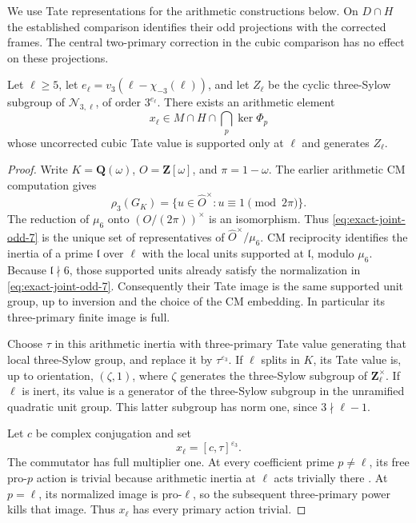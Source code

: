 We use Tate representations for the arithmetic
constructions below. On \(D\cap H\) the established
comparison identifies their odd projections with the
corrected frames. The central two-primary correction in
the cubic comparison has no effect on these projections.

\begin{lemma}\label{lem:local-cubic-cm-inertia}
Let \(\ell\ge5\), let
\(e_\ell=v_3(\ell-\chi_{-3}(\ell))\), and let
\(Z_\ell\) be the cyclic three-Sylow subgroup of
\(\mathcal N_{3,\ell}\), of order \(3^{e_\ell}\).
There exists an arithmetic element
\[
 x_\ell\in M\cap H\cap\bigcap_p\ker\Phi_p
\]
whose uncorrected cubic Tate value is supported only at \(\ell\)
and generates \(Z_\ell\).
\end{lemma}

\begin{proof}
Write \(K=\mathbf Q(\omega)\), \(O=\mathbf Z[\omega]\), and
\(\pi=1-\omega\).
The earlier arithmetic CM computation gives
\begin{equation}\label{eq:exact-joint-odd-7}
\rho_3(G_K)=
 \{u\in\widehat O^\times:u\equiv1\pmod{2\pi}\}.
\end{equation}
The reduction of \(\mu_6\) onto
\((O/(2\pi))^\times\) is an isomorphism.
Thus \eqref{eq:exact-joint-odd-7} is the unique set of representatives of
\(\widehat O^\times/\mu_6\).
CM reciprocity
\cite[Theorem~12.27, p.~124]{MilneMF110} identifies the
inertia of a prime \(\mathfrak l\) over \(\ell\) with the
local units supported at \(\mathfrak l\), modulo \(\mu_6\).
Because \(\mathfrak l\nmid6\), those supported units already
satisfy the normalization in \eqref{eq:exact-joint-odd-7}.
Consequently their Tate image is the same supported
unit group, up to inversion and the choice of the CM
embedding. In particular its three-primary finite image
is full.

Choose \(\tau\) in this arithmetic inertia with three-primary
Tate value generating that local three-Sylow group, and
replace it by \(\tau^{\varepsilon_3}\).
If \(\ell\) splits in \(K\), its Tate value is, up to orientation,
\((\zeta,1)\), where \(\zeta\) generates the three-Sylow
subgroup of \(\mathbf Z_\ell^\times\).
If \(\ell\) is inert, its value is a generator of the
three-Sylow subgroup in the unramified quadratic unit group.
This latter subgroup has norm one, since \(3\nmid\ell-1\).

Let \(c\) be complex conjugation and set
\[
                         x_\ell=[c,\tau]^{\varepsilon_3}.
\]
The commutator has full multiplier one.
At every coefficient prime \(p\ne\ell\), its free pro-\(p\)
action is trivial because arithmetic inertia at \(\ell\)
acts trivially there
\cite[\S8.5, p.~151]{HainMatsumoto2003}.
At \(p=\ell\), its normalized image is pro-\(\ell\),
so the subsequent three-primary power kills that image.
Thus \(x_\ell\) has every primary action trivial.


\end{proof}
